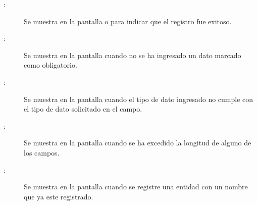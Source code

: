 	
\begin{description}
	\item[:] Se muestra en la pantalla  o  para indicar que el registro fue exitoso.
	\item[:] Se muestra en la pantalla  cuando no se ha ingresado un dato marcado como obligatorio.
	\item[:] Se muestra en la pantalla  cuando el tipo de dato ingresado no cumple con el tipo de dato solicitado en el campo.
	\item[:] Se muestra en la pantalla  cuando se ha excedido la longitud de alguno de los campos.
	\item[:] Se muestra en la pantalla  cuando se registre una entidad con un nombre que ya este registrado.
\end{description}
